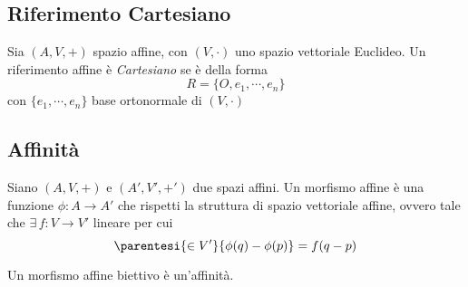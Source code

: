 \subsection{Riferimento Cartesiano}

Sia $ (A, V, +) $ spazio affine, con $ (V, \cdot ) $ uno spazio vettoriale Euclideo. Un riferimento affine è \textit{Cartesiano} se è della forma \[
    R=\{O, e_1, \cdots, e_{n} \}
\] con $ \{e_1, \cdots, e_{n} \} $ base ortonormale di $ (V, \cdot ) $

\subsection{Affinità}

Siano $ (A, V, +) $ e $ (A', V', +') $ due spazi affini. Un morfismo affine è una funzione $ \phi:A\to A' $ che rispetti la struttura di spazio vettoriale affine, ovvero tale che $ \exists\, f:V\to V' $ lineare per cui \begin{equation}
    \parentesi{\in V'}{\phi(q)-\phi(p)}=f(q-p)
\end{equation}

Un morfismo affine biettivo è un'affinità.